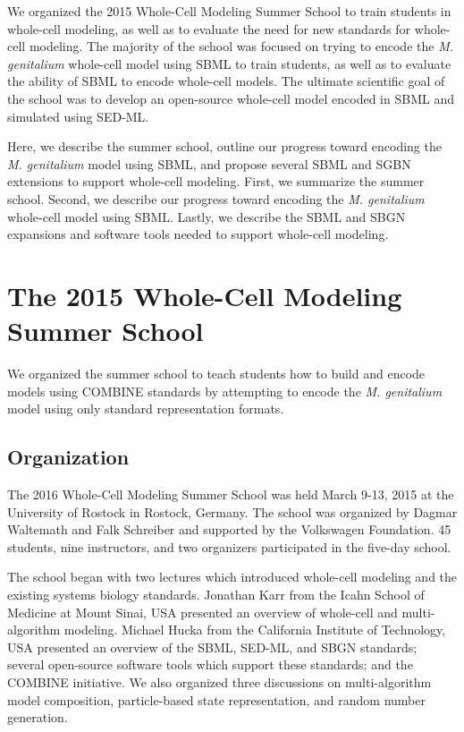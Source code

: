 \documentclass[journal,transmag]{IEEEtran}
\begin{document}
We organized the 2015 Whole-Cell Modeling Summer School to train students in whole-cell modeling, as well as to evaluate the need for new standards for whole-cell modeling. The majority of the school was focused on trying to encode the \textit{M. genitalium} whole-cell model using SBML to train students, as well as to evaluate the ability of SBML to encode whole-cell models. The ultimate scientific goal of the school was to develop an open-source whole-cell model encoded in SBML and simulated using SED-ML.

Here, we describe the summer school, outline our progress toward encoding the \textit{M. genitalium} model using SBML, and propose several SBML and SGBN extensions to support whole-cell modeling. First, we summarize the summer school. Second, we describe our progress toward encoding the \textit{M. genitalium} whole-cell model using SBML. Lastly, we describe the SBML and SBGN expansions and software tools needed to support whole-cell modeling.

\section{The 2015 Whole-Cell Modeling Summer School}
We organized the summer school to teach students how to build and encode models using COMBINE standards by attempting to encode the \textit{M. genitalium} model using only standard representation formats.

\subsection{Organization}
The 2016 Whole-Cell Modeling Summer School was held March 9-13, 2015 at the University of Rostock in Rostock, Germany. The school was organized by Dagmar Waltemath and Falk Schreiber and supported by the Volkswagen Foundation. 45 students, nine instructors, and two organizers participated in the five-day school.

The school began with two lectures which introduced whole-cell modeling and the existing systems biology standards. Jonathan Karr from the Icahn School of Medicine at Mount Sinai, USA presented an overview of whole-cell and multi-algorithm modeling. Michael Hucka from the California Institute of Technology, USA presented an overview of the SBML, SED-ML, and SBGN standards; several open-source software tools which support these standards; and the COMBINE initiative. We also organized three discussions on multi-algorithm model composition, particle-based state representation, and random number generation. 
\end{document}
